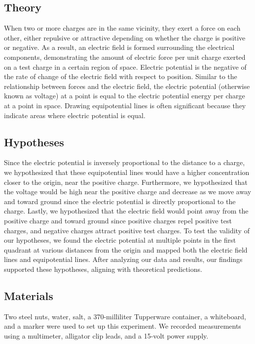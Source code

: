 \documentclass[conference]{IEEEtran}
\begin{document}
\subsection{Theory}
When two or more charges are in the same vicinity, they exert a force on each other, either repulsive or attractive depending on whether the charge is positive or negative. As a result, an electric field is formed surrounding the electrical components, demonstrating the amount of electric force per unit charge exerted on a test charge in a certain region of space. Electric potential is the negative of the rate of change of the electric field with respect to position. Similar to the relationship between forces and the electric field, the electric potential (otherwise known as voltage) at a point is equal to the electric potential energy per charge at a point in space. Drawing equipotential lines is often significant because they indicate areas where electric potential is equal.

\subsection{Hypotheses}

Since the electric potential is inversely proportional to the distance to a charge, we hypothesized that these equipotential lines would have a higher concentration closer to the origin, near the positive charge. Furthermore, we hypothesized that the voltage would be high near the positive charge and decrease as we move away and toward ground since the electric potential is directly proportional to the charge. Lastly, we hypothesized that the electric field would point away from the positive charge and toward ground since positive charges repel positive test charges, and negative charges attract positive test charges. To test the validity of our hypotheses, we found the electric potential at multiple points in the first quadrant at various distances from the origin and mapped both the electric field lines and equipotential lines. After analyzing our data and results, our findings supported these hypotheses, aligning with theoretical predictions.

\subsection{Materials}
Two steel nuts, water, salt, a 370-milliliter Tupperware container, a whiteboard, and a marker were used to set up this experiment. We recorded measurements using a multimeter, alligator clip leads, and a 15-volt power supply.  
\end{document}
